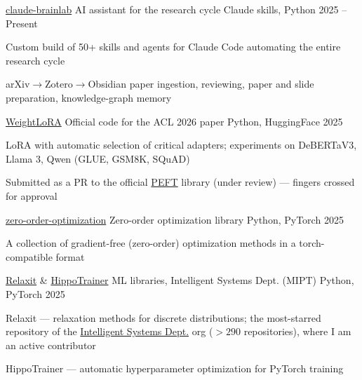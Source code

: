 \begin{cventries}
  \cventry
    {\href{https://github.com/Vepricov/claude-brainlab}{claude-brainlab}} %
    {AI assistant for the research cycle} %
    {Claude skills, Python} %
    {2025 -- Present} %
    {
      \begin{cvitems}
        \item {Custom build of 50+ skills and agents for Claude Code automating the entire research cycle}
        \item {arXiv$\rightarrow$Zotero$\rightarrow$Obsidian paper ingestion, reviewing, paper and slide preparation, knowledge-graph memory}
      \end{cvitems}
    }

  \cventry
    {\href{https://github.com/Vepricov/WLoRA}{WeightLoRA}} %
    {Official code for the ACL 2026 paper} %
    {Python, HuggingFace} %
    {2025} %
    {
      \begin{cvitems}
        \item {LoRA with automatic selection of critical adapters; experiments on DeBERTaV3, Llama 3, Qwen (GLUE, GSM8K, SQuAD)}
        \item {Submitted as a PR to the official \href{https://github.com/huggingface/peft}{PEFT} library (under review) — fingers crossed for approval}
      \end{cvitems}
    }

  \cventry
    {\href{https://github.com/Vepricov/zero-order-optimization}{zero-order-optimization}} %
    {Zero-order optimization library} %
    {Python, PyTorch} %
    {2025} %
    {
      \begin{cvitems}
        \item {A collection of gradient-free (zero-order) optimization methods in a torch-compatible format}
      \end{cvitems}
    }

  \cventry
    {\href{https://github.com/intsystems/relaxit}{Relaxit} \& \href{https://github.com/intsystems/hippotrainer}{HippoTrainer}} %
    {ML libraries, Intelligent Systems Dept. (MIPT)} %
    {Python, PyTorch} %
    {2025} %
    {
      \begin{cvitems}
        \item {Relaxit — relaxation methods for discrete distributions; the most-starred repository of the \href{https://github.com/intsystems}{Intelligent Systems Dept.} org ($>290$ repositories), where I am an active contributor}
        \item {HippoTrainer — automatic hyperparameter optimization for PyTorch training}
      \end{cvitems}
    }


\end{cventries}

